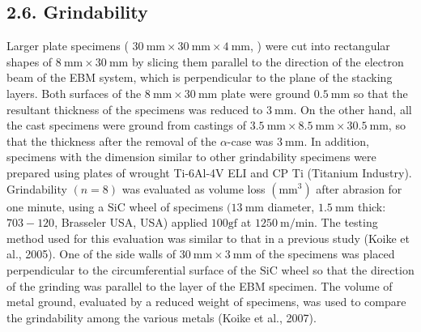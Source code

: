 \documentclass[10pt]{article}
\begin{document}
\subsection*{2.6. Grindability}
Larger plate specimens ( $30 \mathrm{~mm} \times 30 \mathrm{~mm} \times 4 \mathrm{~mm}$, ) were cut into rectangular shapes of $8 \mathrm{~mm} \times 30 \mathrm{~mm}$ by slicing them parallel to the direction of the electron beam of the EBM system, which is perpendicular to the plane of the stacking layers. Both surfaces of the $8 \mathrm{~mm} \times 30 \mathrm{~mm}$ plate were ground $0.5 \mathrm{~mm}$ so that the resultant thickness of the specimens was reduced to $3 \mathrm{~mm}$. On the other hand, all the cast specimens were ground from castings of $3.5 \mathrm{~mm} \times 8.5 \mathrm{~mm} \times 30.5 \mathrm{~mm}$, so that the thickness after the removal of the $\alpha$-case was $3 \mathrm{~mm}$. In addition, specimens with the dimension similar to other grindability specimens were prepared using plates of wrought Ti-6Al-4V ELI and CP Ti (Titanium Industry). Grindability $(n=8)$ was evaluated as volume loss $\left(\mathrm{mm}^{3}\right)$ after abrasion for one minute, using a $\mathrm{SiC}$ wheel of specimens $(13 \mathrm{~mm}$ diameter, $1.5 \mathrm{~mm}$ thick: $703-120$, Brasseler USA, USA) applied $100 \mathrm{gf}$ at $1250 \mathrm{~m} / \mathrm{min}$. The testing method used for this evaluation was similar to that in a previous study (Koike et al., 2005). One of the side walls of $30 \mathrm{~mm} \times 3 \mathrm{~mm}$ of the specimens was placed perpendicular to the circumferential surface of the $\mathrm{SiC}$ wheel so that the direction of the grinding was parallel to the layer of the EBM specimen. The volume of metal ground, evaluated by a reduced weight of specimens, was used to compare the grindability among the various metals (Koike et al., 2007).
\end{document}
